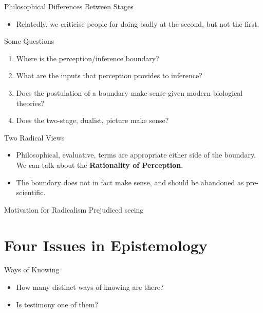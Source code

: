 \documentclass[
  17pt,
  letterpaper,
  ignorenonframetext,
  aspectratio=169,
]{beamer}
\providecommand{\tightlist}{%
  \setlength{\itemsep}{0pt}\setlength{\parskip}{0pt}}\usepackage{longtable,booktabs,array}
\begin{document}
\begin{frame}{Philosophical Differences Between Stages}
\protect\hypertarget{philosophical-differences-between-stages-2}{}
\begin{itemize}[<+->]
\tightlist
\item
  Relatedly, we criticise people for doing badly at the second, but not
  the first.
\end{itemize}
\end{frame}

\begin{frame}{Some Questions}
\protect\hypertarget{some-questions}{}
\begin{enumerate}[<+->]
\tightlist
\item
  Where is the perception/inference boundary?
\item
  What are the inputs that perception provides to inference?
\item
  Does the postulation of a boundary make sense given modern biological
  theories?
\item
  Does the two-stage, dualist, picture make sense?
\end{enumerate}
\end{frame}

\begin{frame}{Two Radical Views}
\protect\hypertarget{two-radical-views}{}
\begin{itemize}[<+->]
\tightlist
\item
  Philosophical, evaluative, terms are appropriate either side of the
  boundary. We can talk about the \textbf{Rationality of Perception}.
\item
  The boundary does not in fact make sense, and should be abandoned as
  pre-scientific.
\end{itemize}
\end{frame}

\begin{frame}{Motivation for Radicalism}
\protect\hypertarget{motivation-for-radicalism}{}
Prejudiced seeing
\end{frame}

\hypertarget{four-issues-in-epistemology}{%
\section{Four Issues in
Epistemology}\label{four-issues-in-epistemology}}

\begin{frame}{Ways of Knowing}
\protect\hypertarget{ways-of-knowing}{}
\begin{itemize}[<+->]
\tightlist
\item
  How many distinct ways of knowing are there?
\item
  Is testimony one of them?
\end{itemize}
\end{frame}
\end{document}
